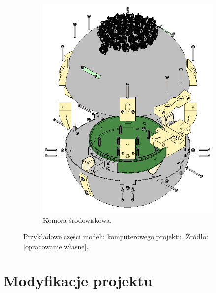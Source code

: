 \begin{figure}[]
\begin{subfigure}[b]{.49\textwidth}
		\label{fig:czwórnik}
	\end{subfigure}\vspace{15mm}%
	
	\begin{subfigure}{.8\textwidth}
		\centering
		\includegraphics[scale=0.3]{Komora_tweaked_colors_exploded}
		\caption{Komora środowiskowa.} 
		\label{fig:komora}
	\end{subfigure}
	
	\caption{Przykładowe części modelu komputerowego projektu. Źródło: [opracowanie własne].}
	
\end{figure}


\section{Modyfikacje projektu}

